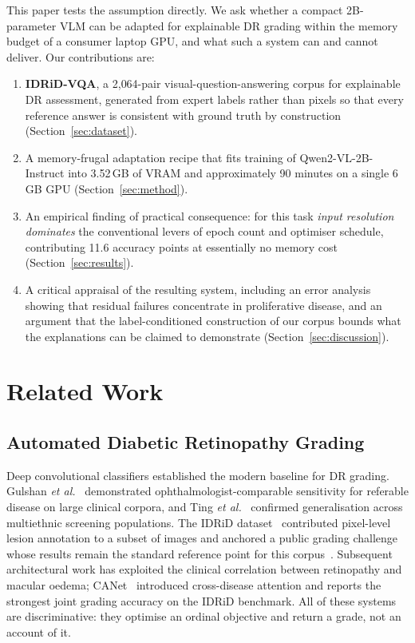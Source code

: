 \documentclass[conference]{IEEEtran}
\begin{document}
This paper tests the assumption directly. We ask whether a compact 2B-parameter
VLM can be adapted for explainable DR grading within the memory budget of a
consumer laptop GPU, and what such a system can and cannot deliver. Our
contributions are:

\begin{enumerate}
\item \textbf{IDRiD-VQA}, a 2{,}064-pair visual-question-answering corpus for
explainable DR assessment, generated from expert labels rather than pixels so
that every reference answer is consistent with ground truth by construction
(Section~\ref{sec:dataset}).
\item A memory-frugal adaptation recipe that fits training of
Qwen2-VL-2B-Instruct into 3.52\,GB of VRAM and approximately 90 minutes on a
single 6\,GB GPU (Section~\ref{sec:method}).
\item An empirical finding of practical consequence: for this task
\emph{input resolution dominates} the conventional levers of epoch count and
optimiser schedule, contributing 11.6 accuracy points at essentially no memory
cost (Section~\ref{sec:results}).
\item A critical appraisal of the resulting system, including an error analysis
showing that residual failures concentrate in proliferative disease, and an
argument that the label-conditioned construction of our corpus bounds what the
explanations can be claimed to demonstrate (Section~\ref{sec:discussion}).
\end{enumerate}

\section{Related Work}

\subsection{Automated Diabetic Retinopathy Grading}
Deep convolutional classifiers established the modern baseline for DR grading.
Gulshan \textit{et al.}~\cite{gulshan2016development} demonstrated
ophthalmologist-comparable sensitivity for referable disease on large clinical
corpora, and Ting \textit{et al.}~\cite{ting2017development} confirmed
generalisation across multiethnic screening populations. The IDRiD
dataset~\cite{porwal2018idrid} contributed pixel-level lesion annotation to a
subset of images and anchored a public grading challenge whose results remain the
standard reference point for this corpus~\cite{porwal2020challenge}. Subsequent
architectural work has exploited the clinical correlation between retinopathy and
macular oedema; CANet~\cite{li2019canet} introduced cross-disease attention and
reports the strongest joint grading accuracy on the IDRiD benchmark. All of these
systems are discriminative: they optimise an ordinal objective and return a
grade, not an account of it.
\end{document}
